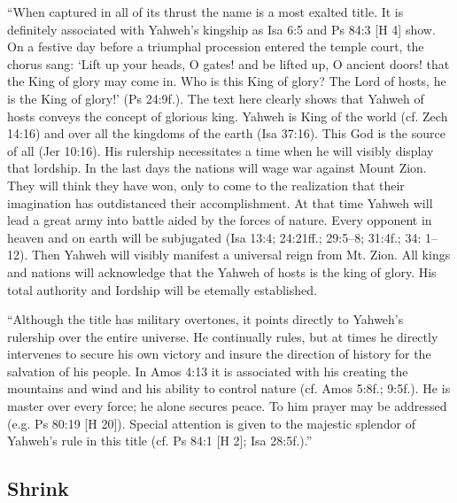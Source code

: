 \begin{compactdesc}
\begin{compactitem}
						\item ``When captured in all of its thrust the name  is a most exalted title. It is definitely associated with Yahweh's kingship as Isa 6:5 and Ps 84:3 [H 4] show. On a festive day before a triumphal procession entered the temple court, the chorus sang: `Lift up your heads, O gates! and be lifted up, O ancient doors! that the King of glory may come in. Who is this King of glory? The Lord of hosts, he is the King of glory!' (Ps 24:9f.). The text here clearly shows that Yahweh of hosts conveys the concept of glorious king. Yahweh is King of the world (cf. Zech 14:16) and over all the kingdoms of the earth (Isa 37:16). This God is the source of all (Jer 10:16). His rulership necessitates a time when he will visibly display that lordship. In the last days the nations will wage war against Mount Zion. They will think they have won, only to come to the realization that their imagination has outdistanced their accomplishment. At that time Yahweh will lead a great army into battle aided by the forces of nature. Every opponent in heaven and on earth will be subjugated (Isa 13:4; 24:21ff.; 29:5--8; 31:4f.; 34: 1--12). Then Yahweh will visibly manifest a universal reign from Mt. Zion. All kings and nations will acknowledge that the Yahweh of hosts is the king of glory. His total authority and Iordship will be etemally established. 
						\item ``Although the title has military overtones, it points directly to Yahweh's rulership over the entire universe. He continually rules, but at times he directly intervenes to secure his own victory and insure the direction of history for the salvation of his people. In Amos 4:13 it is associated with his creating the mountains and wind and his ability to control nature (cf. Amos 5:8f.; 9:5f.). He is master over every force; he alone secures peace. To him prayer may be addressed (e.g. Ps 80:19 [H 20]). Special attention is given to the majestic splendor of Yahweh's rule in this title (cf. Ps 84:1 [H 2]; Isa 28:5f.).''
					\end{compactitem}
				\item[TDOT 12:215, PDF 236] \phantom{.}
			\end{compactdesc}
			
	\subsection{Shrink} %
		\label{SHRINK}
	
